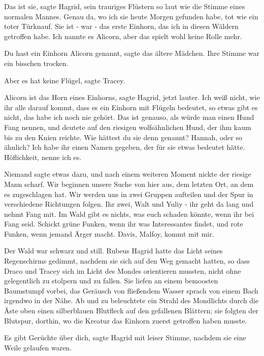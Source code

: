 \glqq{}Das ist sie\grqq{}, sagte Hagrid, sein trauriges Flüstern so laut wie die
Stimme eines normalen Mannes. \glqq{}Genau da, wo ich sie heute Morgen
gefunden habe, tot wie ein toter Türknauf. Sie ist - war - das erste
Einhorn, das ich in diesen Wäldern getroffen habe. Ich nannte es Alicorn,
aber das spielt wohl keine Rolle mehr.\grqq{}

\glqq{}Du hast ein Einhorn Alicorn genannt\grqq{}, sagte das ältere Mädchen. Ihre
Stimme war ein bisschen trocken.

\glqq{}Aber es hat keine Flügel\grqq{}, sagte Tracey.

\glqq{}Alicorn ist das Horn eines Einhorns\grqq{}, sagte Hagrid, jetzt lauter.
\glqq{}Ich weiß nicht, wie ihr alle darauf kommt, dass es ein Einhorn mit
Flügeln bedeutet, so etwas gibt es nicht, das habe ich noch nie gehört.
Das ist genauso, als würde man einen Hund Fang nennen\grqq{}, und deutete
auf den riesigen wolfsähnlichen Hund, der ihm kaum bis zu den Knien
reichte. \glqq{}Wie hättest du sie denn genannt? Hannah, oder so ähnlich?
Ich habe ihr einen Namen gegeben, der für sie etwas bedeutet hätte.
Höflichkeit, nenne ich es.\grqq{}

Niemand sagte etwas dazu, und nach einem weiteren Moment nickte der riesige Mann
scharf. \glqq{}Wir beginnen unsere Suche von hier aus, dem letzten Ort, an
dem es zugeschlagen hat. Wir werden uns in zwei Gruppen aufteilen und der
Spur in verschiedene Richtungen folgen. Ihr zwei, Walt und Yuliy - ihr
geht da lang und nehmt Fang mit. Im Wald gibt es nichts, was euch schaden
könnte, wenn ihr bei Fang seid. Schickt grüne Funken, wenn ihr was
Interessantes findet, und rote Funken, wenn jemand Ärger macht. Davis,
Malfoy, kommt mit mir.\grqq{}

Der Wald war schwarz und still. Rubeus Hagrid hatte das Licht seines
Regenschirms gedimmt, nachdem sie sich auf den Weg gemacht hatten, so
dass Draco und Tracey sich im Licht des Mondes orientieren mussten, nicht
ohne gelegentlich zu stolpern und zu fallen. Sie liefen an einem
bemoosten Baumstumpf vorbei, das Geräusch von fließendem Wasser sprach
von einem Bach irgendwo in der Nähe. Ab und zu beleuchtete ein Strahl des
Mondlichts durch die Äste oben einen silberblauen Blutfleck auf den
gefallenen Blättern; sie folgten der Blutspur, dorthin, wo die Kreatur
das Einhorn zuerst getroffen haben musste.

\glqq{}Es gibt Gerüchte über dich\grqq{}, sagte Hagrid mit leiser Stimme, nachdem
sie eine Weile gelaufen waren.

